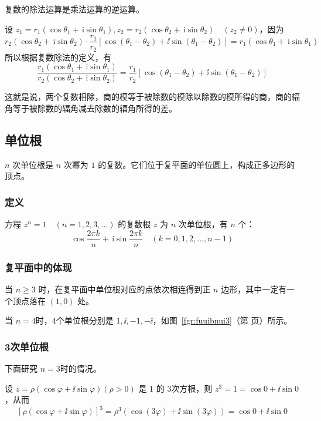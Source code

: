 \documentclass[a4paper,openany]{ctexbook}
\begin{document}
复数的除法运算是乘法运算的逆运算。

设 \(z_1=r_1(\cos \theta_1 + \,\mathrm{i} \sin \theta _1),z_2=r_2
(\cos \theta_2 + \,\mathrm{i} \sin \theta _2)\quad (z_2 \ne 0)\)，因为
\[
    r_2(\cos \theta_2 + \,\mathrm{i} \sin \theta _2)\cdot\frac{r_1}{r_2}[\cos (\theta _1-\theta _2)+
        \ii \sin (\theta _1-\theta _2)]=r_1(\cos \theta_1 + \,\mathrm{i} \sin \theta _1)
\]
所以根据复数除法的定义，有
\[
    \boxed{
        \frac{r_1(\cos \theta_1 + \,\mathrm{i} \sin \theta _1)}{r_2(\cos \theta_2 + \,\mathrm{i} \sin \theta _2)}=\frac{r_1}{r_2}[\cos (\theta _1-\theta _2)+
            \ii \sin (\theta _1-\theta _2)]
    }
\]

这就是说，两个复数相除，商的模等于被除数的模除以除数的模所得的商，商的辐角等于被除数的辐角减去除数的辐角所得的差。

\subsection{单位根}

\(n\) 次单位根是 \(n\) 次幂为 \(1\) 的复数。它们位于复平面的单位圆上，构成正多边形的顶点。

\subsubsection{定义}

方程 \(z^n=1\quad (n=1,2,3,\dots)\) 的复数根 \(z\) 为 \(n\) 次单位根，有 \(n\) 个：
\[\cos \frac{2 \pi k}{n}+\,\mathrm{i} \sin \frac{2 \pi k}{n}\quad (k=0,1,2,\dots,n-1)\]

\subsubsection{复平面中的体现}

当 \(n \ge 3\) 时，在复平面中单位根对应的点依次相连得到正 \(n\) 边形，其中一定有一个顶点落在 \((1,0)\) 处。

当 \(n=4\)时，\(4\)个单位根分别是 \(1,\ii,-1,-\ii\)，如图~\ref{fgr:fuuibnui3}（第 \pageref{fgr:fuuibnui3} 页）所示。

\subsubsection{3次单位根}

下面研究 \(n=3\)时的情况。

设 \(z= \rho (\cos \varphi +\ii \sin \varphi )(\rho >0)\) 是 \(1\) 的 \(3\)次方根，则 \(z^3=1=\cos 0+\ii \sin 0\)，从而
\[
    [\rho (\cos \varphi +\ii \sin \varphi )]^3=\rho ^3(\cos (3 \varphi )+\ii \sin (3 \varphi ))=\cos 0+\ii \sin 0
\]
\end{document}
